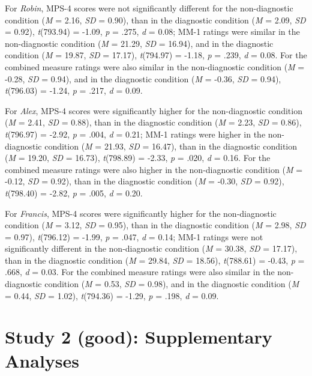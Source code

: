 \documentclass[
  man,floatsintext]{apa6}
\begin{document}
For \emph{Robin}, MPS-4 scores were not significantly different for the non-diagnostic condition (\emph{M} = 2.16, \emph{SD} = 0.90), than in the diagnostic condition (\emph{M} = 2.09, \emph{SD} = 0.92), \emph{t}(793.94) = -1.09, \emph{p} = .275, \emph{d} = 0.08; MM-1 ratings were similar in the non-diagnostic condition (\emph{M} = 21.29, \emph{SD} = 16.94), and in the diagnostic condition (\emph{M} = 19.87, \emph{SD} = 17.17), \emph{t}(794.97) = -1.18, \emph{p} = .239, \emph{d} = 0.08. For the combined measure ratings were also similar in the non-diagnostic condition (\emph{M} = -0.28, \emph{SD} = 0.94), and in the diagnostic condition (\emph{M} = -0.36, \emph{SD} = 0.94), \emph{t}(796.03) = -1.24, \emph{p} = .217, \emph{d} = 0.09.

For \emph{Alex}, MPS-4 scores were significantly higher for the non-diagnostic condition (\emph{M} = 2.41, \emph{SD} = 0.88), than in the diagnostic condition (\emph{M} = 2.23, \emph{SD} = 0.86), \emph{t}(796.97) = -2.92, \emph{p} = .004, \emph{d} = 0.21; MM-1 ratings were higher in the non-diagnostic condition (\emph{M} = 21.93, \emph{SD} = 16.47), than in the diagnostic condition (\emph{M} = 19.20, \emph{SD} = 16.73), \emph{t}(798.89) = -2.33, \emph{p} = .020, \emph{d} = 0.16. For the combined measure ratings were also higher in the non-diagnostic condition (\emph{M} = -0.12, \emph{SD} = 0.92), than in the diagnostic condition (\emph{M} = -0.30, \emph{SD} = 0.92), \emph{t}(798.40) = -2.82, \emph{p} = .005, \emph{d} = 0.20.

For \emph{Francis}, MPS-4 scores were significantly higher for the non-diagnostic condition (\emph{M} = 3.12, \emph{SD} = 0.95), than in the diagnostic condition (\emph{M} = 2.98, \emph{SD} = 0.97), \emph{t}(796.12) = -1.99, \emph{p} = .047, \emph{d} = 0.14; MM-1 ratings were not significantly different in the non-diagnostic condition (\emph{M} = 30.38, \emph{SD} = 17.17), than in the diagnostic condition (\emph{M} = 29.84, \emph{SD} = 18.56), \emph{t}(788.61) = -0.43, \emph{p} = .668, \emph{d} = 0.03. For the combined measure ratings were also similar in the non-diagnostic condition (\emph{M} = 0.53, \emph{SD} = 0.98), and in the diagnostic condition (\emph{M} = 0.44, \emph{SD} = 1.02), \emph{t}(794.36) = -1.29, \emph{p} = .198, \emph{d} = 0.09.

\pagebreak

\section{Study 2 (good): Supplementary Analyses}\label{study-2-good-supplementary-analyses}
\end{document}
